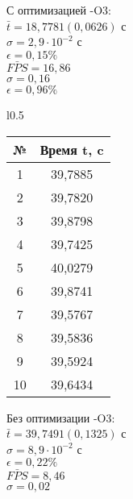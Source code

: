 \documentclass[12pt, letterpaper]{article}
\begin{document}
     С оптимизацией -O3:\\                 

    $\bar{t} = 18,7781 (0,0626)$ с\\

    $\sigma = 2,9 \cdot 10^{-2}$ с\\
    
    $\epsilon = 0,15\%$\\
        
    $\bar{FPS} = 16,86$\\

    $\sigma = 0,16$\\

    $\epsilon = 0,96\%$\\
    
    \begin{wraptable}{l}{0.5\textwidth}
        \begin{tabular}{cc} 
        \toprule             %
        \textbf{№} & \textbf{Время t, c} \\
        \midrule             %
        1 & 39,7885 \\
        2 & 39,7820 \\
        3 & 39,8798 \\
        4 & 39,7425 \\
        5 & 40,0279 \\
        6 & 39,8741 \\
        7 & 39,5767 \\
        8 & 39,5836 \\
        9 & 39,5924 \\
        10 & 39,6434 \\
        \bottomrule          %
        \end{tabular}
    \end{wraptable}

    Без оптимизации -O3:\\                 

    $\bar{t} = 39,7491 (0,1325)$ с\\

    $\sigma = 8,9 \cdot 10^{-2}$ с\\
    
    $\epsilon = 0,22\%$\\
        
    $\bar{FPS} = 8,46$\\

    $\sigma = 0,02$\\
\end{document}
